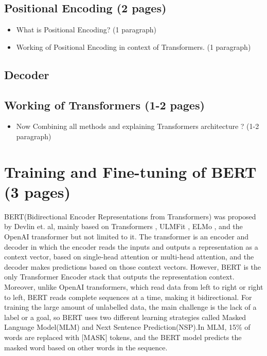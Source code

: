 \documentclass[%
	BCOR=8mm, %
	DIV=12, 
	toc=bibliography, %
	toc=listof, %
	oneside, %
	egregdoesnotlikesansseriftitles, %
	]{scrbook}
\begin{document}
\subsection{Positional Encoding (2 pages)}
\begin{itemize}
\item What is Positional Encoding? (1 paragraph)
\item Working of Positional Encoding in context of Transformers. (1 paragraph)
\end{itemize}
\subsection{Decoder}

\subsection{ Working of Transformers (1-2 pages)}
\begin{itemize}
\item Now Combining all methods and explaining Transformers architecture ? (1-2 paragraph)
\end{itemize}



\section{Training and Fine-tuning of BERT (3 pages)}
BERT(Bidirectional Encoder Representations from Transformers) was proposed by Devlin et$.$ al\cite{devlin_bert_2019}, mainly based on Transformers \cite{vaswani_attention_2017}, 
ULMFit \cite{howard_universal_2018}, ELMo \cite{peters_deep_2018}, and the OpenAI transformer \cite{radford_improving_nodate} but not limited to it. 
The transformer is an encoder and decoder in which the encoder reads the inputs and outputs a representation as a context vector, based on single-head attention or multi-head attention, 
and the decoder makes predictions based on those context vectors. However, BERT is the only Transformer Encoder stack that outputs the representation context. Moreover, unlike 
OpenAI transformers, which read data from left to right or right to left, BERT reads complete sequences at a time, making it bidirectional. For training the large amount of unlabelled data, 
the main challenge is the lack of a label or a goal, so BERT uses two different learning strategies called Masked Language Model(MLM) and Next Sentence Prediction(NSP).In MLM, 15\% of 
words are replaced with [MASK] tokens, and the BERT model predicts the masked word based on other words in the sequence.\\
\end{document}
